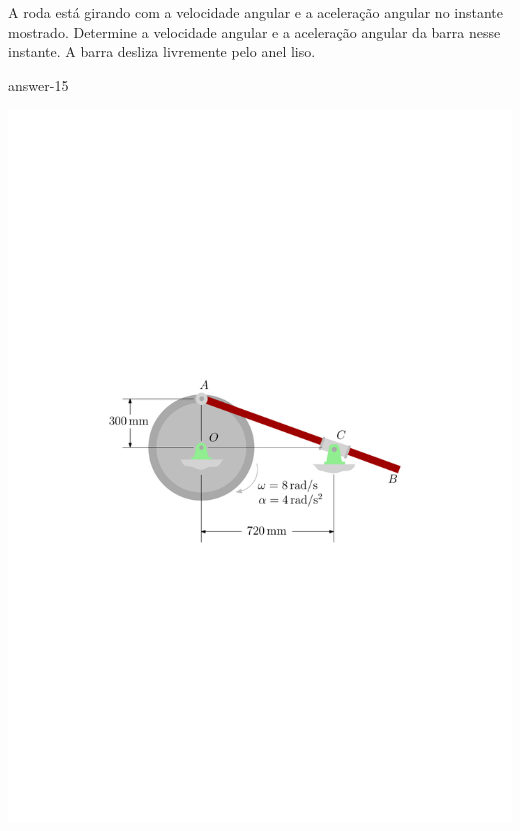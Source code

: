\item A roda está girando com a velocidade angular e a aceleração angular no instante mostrado.
Determine a velocidade angular e a aceleração angular da barra nesse instante. A barra desliza livremente pelo anel liso.

{answer-15}

\vspace{-2.5cm}
\begin{flushleft}
	\includegraphics[scale=.9]{images/draw_14}
\end{flushleft}